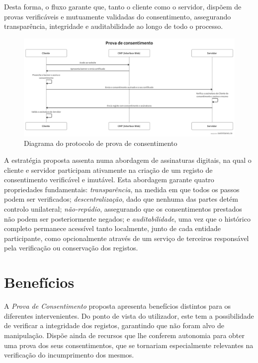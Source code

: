 Desta forma, o fluxo garante que, tanto o cliente como o servidor, dispõem de provas verificáveis e mutuamente validadas do consentimento, assegurando transparência, integridade e auditabilidade ao longo de todo o processo.

\begin{figure}[h]
\begin{center}
\includegraphics[width=1\textwidth]{images/swimlanes.png}
\end{center}
\caption{Diagrama do protocolo de prova de consentimento}
\label{fig:swimlane1}
\end{figure}

\newpage

A estratégia proposta assenta numa abordagem de assinaturas digitais, na qual o cliente e servidor participam ativamente na criação de um registo de consentimento verificável e imutável. Esta abordagem garante quatro propriedades fundamentais: \textit{transparência}, na medida em que todos os passos podem ser verificados; \textit{descentralização}, dado que nenhuma das partes detém controlo unilateral; \textit{não-repúdio}, assegurando que os consentimentos prestados não podem ser posteriormente negados; e \textit{auditabilidade}, uma vez que o histórico completo permanece acessível tanto localmente, junto de cada entidade participante, como opcionalmente através de um serviço de terceiros responsável pela verificação ou conservação dos registos.

\section{Benefícios}

A \textit{Prova de Consentimento} proposta apresenta benefícios distintos para os diferentes intervenientes.
Do ponto de vista do utilizador, este tem a possibilidade de verificar a integridade dos registos, garantindo que não foram alvo de manipulação. Dispõe ainda de recursos que lhe conferem autonomia para obter uma prova dos seus consentimentos, que se tornariam especialmente relevantes na verificação do incumprimento dos mesmos.

